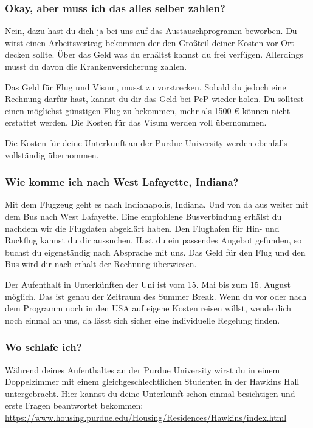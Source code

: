 \documentclass[
  paper=a4,
  fontsize=12pt,
  DIV=16,
  headheight=52pt,
  footheight=45pt,
  headinclude,
  parskip=full,
]{scrartcl}
\begin{document}
\subsubsection*{Okay, aber muss ich das alles selber zahlen?}
Nein, dazu hast du dich ja bei uns auf das Austauschprogramm beworben.
Du wirst einen Arbeitsvertrag bekommen der den Großteil deiner Kosten vor Ort
decken sollte.
Über das Geld was du erhältst kannst du frei verfügen.
Allerdings musst du davon die Krankenversicherung zahlen.

Das Geld für Flug und Visum, musst zu vorstrecken.
Sobald du jedoch eine Rechnung darfür hast, kannst du dir das Geld bei PeP
wieder holen.
Du solltest einen möglichst günstigen Flug zu bekommen, mehr als 1500 € können
nicht erstattet werden.
Die Kosten für das Visum werden voll übernommen.

Die Kosten für deine Unterkunft an der Purdue University werden ebenfalls
vollständig übernommen.

\subsubsection*{Wie komme ich nach West Lafayette, Indiana?}
Mit dem Flugzeug geht es nach Indianapolis, Indiana. Und von da aus weiter
mit dem Bus nach West Lafayette.
Eine empfohlene Busverbindung erhälst du nachdem wir die Flugdaten abgeklärt
haben.
Den Flughafen für Hin- und Ruckflug kannst du dir aussuchen.
Hast du ein passendes Angebot gefunden, so buchst du eigenständig nach Absprache
mit uns. Das Geld für den Flug und den Bus wird dir nach erhalt der Rechnung
überwiesen.

Der Aufenthalt in Unterkünften der Uni ist vom 15. Mai bis zum 15. August
möglich. Das ist genau der Zeitraum des Summer Break. Wenn du vor oder nach dem
Programm noch in den USA auf eigene Kosten reisen willst, wende dich noch einmal
an uns, da lässt sich sicher eine individuelle Regelung finden.


\subsubsection*{Wo schlafe ich?}
Während deines Aufenthaltes an der Purdue University wirst du in einem
Doppelzimmer mit einem gleichgeschlechtlichen Studenten in der Hawkins Hall
untergebracht.
Hier kannst du deine Unterkunft schon einmal besichtigen und erste Fragen
beantwortet bekommen:
\url{https://www.housing.purdue.edu/Housing/Residences/Hawkins/index.html}
\end{document}
